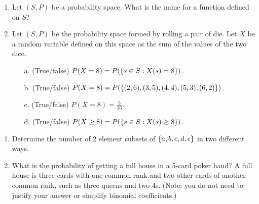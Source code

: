 \documentclass[10pt]{beamer}
\begin{document}
\begin{frame}
\small 

\begin{myredbox}[title=\text{Reading Quiz (Random Variables)}]


\begin{enumerate}
	\item Let $(S,P)$ be a probability space. What is the name for a function defined on $S$?
	\item Let $(S,P)$ be the probability space formed by rolling a pair of die.   Let $X$ be a random variable defined on this space as the sum of the values of the two dice. 
	\begin{enumerate}
	\item[a.] (True/false)  $P(X=8) = P(\{ {s \in S : X(s) = 8} \})$.
	\item[b.] (True/false)  $P(X=8) = P(\{ {(2,6), (3,5), (4,4), (5,3), (6,2)} \})$.
	\item[c.] (True/false)  $P(X=8) = \frac{5}{36}$.
	\item[d.] (True/false)
		$P(X \geq 8) = P(\{ {s \in S : X(s) \geq 8} \})$.
	\end{enumerate}
\end{enumerate}
\end{myredbox}

\vspace{-.2cm}

\begin{mygreenbox}[title=\text{Problems Quiz (Binomial Coefficients, Incl/Excl, Intro to Probability)}]

\begin{enumerate}
\item Determine the number of 2 element subsets of $\{ {a,b,c,d,e} \}$ in two different ways. 
\item What is the probability of getting a full house in a 5-card poker hand?  A full house is three cards with one common rank and two other cards of another common rank, such as three queens and two 4s.  (Note: you do not need to justify your answer or simplify binomial coefficients.)
\end{enumerate}

\end{mygreenbox}
	
\end{frame}


\end{document}

